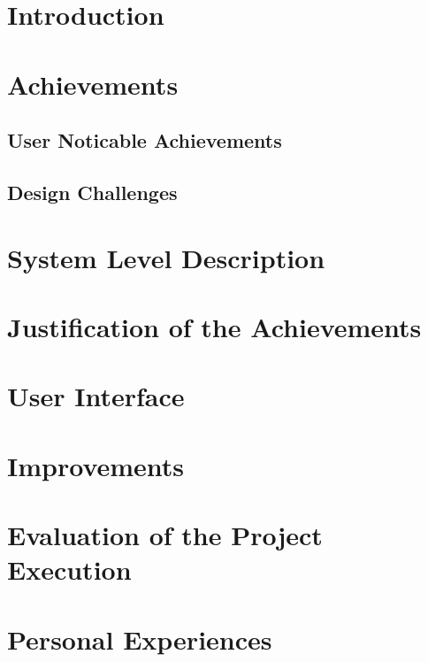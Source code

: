 \pagestyle{plain}
\setcounter{page}{1}

\section{Introduction}\label{cha:intro}


\section{Achievements}\label{cha:achievements}
  \subsection{User Noticable Achievements}\label{sec:userachievments}
  

  \subsection{Design Challenges}\label{sec:designchallenges}
  

\section{System Level Description}\label{cha:syslvl}


\section{Justification of the Achievements}\label{cha:justice}


\section{User Interface}\label{cha:ui}


\section{Improvements}\label{cha:improvements}


\section{Evaluation of the Project Execution}\label{cha:eval}
\section{Personal Experiences}\label{cha:personalexp}
